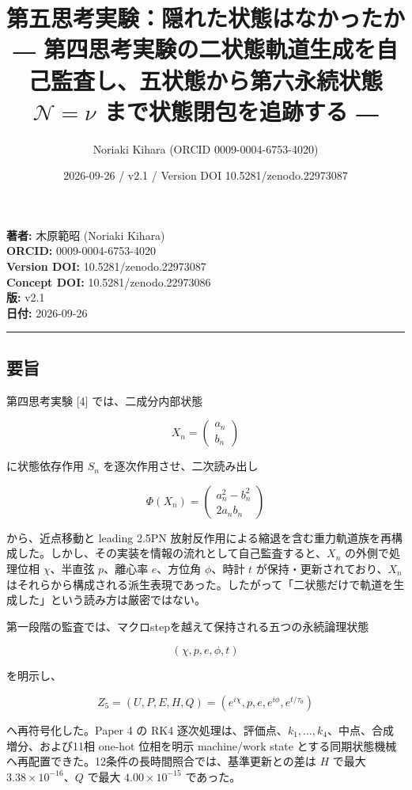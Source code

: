 \documentclass[
  a4paper,
]{ltjsarticle}
\title{第五思考実験：隠れた状態はなかったか ―
第四思考実験の二状態軌道生成を自己監査し、五状態から第六永続状態
\(\mathcal N=\nu\) まで状態閉包を追跡する ―}
\author{Noriaki Kihara (ORCID 0009-0004-6753-4020)}
\date{2026-09-26 / v2.1 / Version DOI 10.5281/zenodo.22973087}
\begin{document}
\maketitle

\textbf{著者:} 木原範昭 (Noriaki Kihara)\\
\textbf{ORCID:} 0009-0004-6753-4020\\
\textbf{Version DOI:} 10.5281/zenodo.22973087\\
\textbf{Concept DOI:} 10.5281/zenodo.22973086\\
\textbf{版:} v2.1\\
\textbf{日付:} 2026-09-26

\begin{center}\rule{0.5\linewidth}{0.5pt}\end{center}

\subsection{要旨}\label{ux8981ux65e8}

第四思考実験 {[}4{]} では、二成分内部状態

\[
X_n=\begin{pmatrix}a_n\\b_n\end{pmatrix}
\]

に状態依存作用 \(S_n\) を逐次作用させ、二次読み出し

\[
\Phi(X_n)=
\begin{pmatrix}
a_n^2-b_n^2\\
2a_nb_n
\end{pmatrix}
\]

から、近点移動と leading 2.5PN
放射反作用による縮退を含む重力軌道族を再構成した。しかし、その実装を情報の流れとして自己監査すると、\(X_n\)
の外側で処理位相 \(\chi\)、半直弦 \(p\)、離心率 \(e\)、方位角
\(\phi\)、時計 \(t\) が保持・更新されており、\(X_n\)
はそれらから構成される派生表現であった。したがって「二状態だけで軌道を生成した」という読み方は厳密ではない。

第一段階の監査では、マクロstepを越えて保持される五つの永続論理状態

\[
(\chi,p,e,\phi,t)
\]

を明示し、

\[
Z_5=(U,P,E,H,Q)
=(e^{i\chi},p,e,e^{i\phi},e^{t/\tau_0})
\]

へ再符号化した。Paper 4 の RK4
逐次処理は、評価点、\(k_1,\ldots,k_4\)、中点、合成増分、および11相
one-hot 位相を明示 machine/work state
とする同期状態機械へ再配置できた。12条件の長時間照合では、基準更新との差は
\(H\) で最大 \(3.38\times10^{-16}\)、\(Q\) で最大 \(4.00\times10^{-15}\)
であった。
\end{document}
